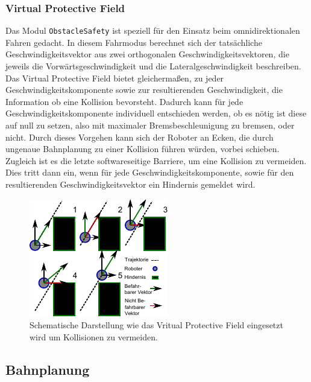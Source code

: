 \subsubsection{Virtual Protective Field}
\label{bahnplanung_virtual_protective_field_sec}

Das Modul \lstinline{ObstacleSafety} ist speziell für den Einsatz beim omnidirektionalen Fahren gedacht. In diesem Fahrmodus berechnet sich der tatsächliche Geschwindigkeitsvektor aus zwei orthogonalen Geschwindigkeitsvektoren, die jeweils die Vorwärtsgeschwindigkeit und die Lateralgeschwindigkeit beschreiben. Das Virtual Protective Field bietet gleichermaßen, zu jeder Geschwindigkeitskomponente sowie zur resultierenden Geschwindigkeit, die Information ob eine Kollision bevorsteht. Dadurch kann für jede Geschwindigkeitskomponente individuell entschieden werden, ob es nötig ist diese auf null zu setzen, also mit maximaler Bremsbeschleunigung zu bremsen, oder nicht. Durch dieses Vorgehen kann sich der Roboter an Ecken, die durch ungenaue Bahnplanung zu einer Kollision führen würden, vorbei schieben. Zugleich ist es die letzte softwareseitige Barriere, um eine Kollision zu vermeiden. Dies tritt dann ein, wenn für jede Geschwindigkeitskomponente, sowie für den resultierenden Geschwindigkeitsvektor ein Hindernis gemeldet wird.

\begin{figure}
	\label{fig:bahnplanung_umsetzung_vpf}
	\centering
	\includegraphics[scale=2]{graphics/SCHEMA-vpf.pdf}
	\caption{Schematische Darstellung wie das Vritual Protective Field eingesetzt wird um Kollisionen zu vermeiden.}
\end{figure}

\subsection{Bahnplanung}
\label{bahnplanung_subsec}
\authorsection{\editortobias}


